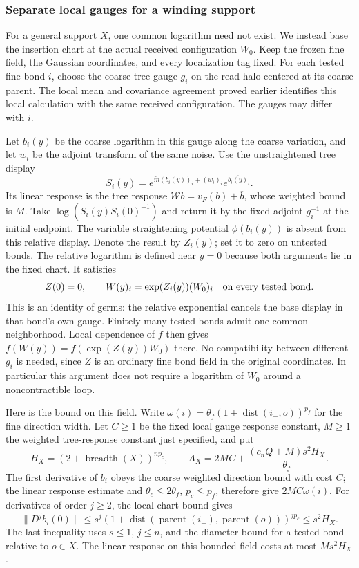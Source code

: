 \subsubsection{Separate local gauges for a winding support}
For a general support $X$, one common logarithm need not exist. We instead
base the insertion chart at the actual received configuration $W_0$.
Keep the frozen fine field, the Gaussian coordinates, and every localization
tag fixed. For each tested fine bond $i$, choose the coarse tree gauge
$g_i$ on the read halo centered at its coarse parent. The local mean and
covariance agreement proved earlier identifies this local calculation with
the same received configuration. The gauges may differ with $i$.

Let $b_i(y)$ be the coarse logarithm in this gauge along the coarse
variation, and let $w_i$ be the adjoint transform of the same noise. Use the unstraightened tree display
\[
 S_i(y)=e^{\widetilde m(b_i(y))_i+(w_i)_i}
                           e^{\overline {b_i(y)}_i}.
\]
Its linear response is the tree response
$\mathcal W b=v_F(b)+\overline b$, whose weighted bound is $M$.
Take $\log(S_i(y)S_i(0)^{-1})$ and return it by the fixed adjoint
$g_i^{-1}$ at the initial endpoint. The variable straightening
potential $\phi(b_i(y))$ is absent from this relative display. Denote the result by $Z_i(y)$;
set it to zero on untested bonds. The relative logarithm is defined
near $y=0$ because both arguments lie in the fixed chart. It satisfies
\[
 Z(0)=0,\qquad
 W(y)_i=\exp(Z_i(y))(W_0)_i
                 \quad\hbox{on every tested bond}.
\]
This is an identity of germs: the relative exponential cancels the
base display in that bond's own gauge. Finitely many tested bonds admit
one common neighborhood. Local dependence of $f$ then gives
$f(W(y))=f(\exp(Z(y))W_0)$ there. No compatibility between different
$g_i$ is needed, since $Z$ is an ordinary fine bond field in the original
coordinates. In particular this argument does not require a logarithm
of $W_0$ around a noncontractible loop.

Here is the bound on this field. Write
$\omega(i)=\theta_f(1+\operatorname{dist}(i_-,o))^{p_f}$ for the
fine direction width. Let $C\ge1$ be the fixed local gauge response
constant, $M\ge1$ the weighted tree-response constant just specified, and put
\[
 H_X=(2+\operatorname{breadth}(X))^{np_c},\qquad
 A_X=2MC+\frac{(c_nQ+M)s^2H_X}{\theta_f}.
\]
The first derivative of $b_i$ obeys the coarse weighted direction bound
with cost $C$; the linear response estimate and
$\theta_c\le2\theta_f$, $p_c\le p_f$, therefore give
$2MC\omega(i)$. For derivatives of order $j\ge2$, the local chart
bound gives
\[
 \|D^jb_i(0)\|\le s^j
 (1+\operatorname{dist}(\operatorname{parent}(i_-),
                         \operatorname{parent}(o)))^{jp_c}
 \le s^2H_X.
\]
The last inequality uses $s\le1$, $j\le n$, and the diameter bound
for a tested bond relative to $o\in X$. The linear response on this
bounded field costs at most $Ms^2H_X$.

